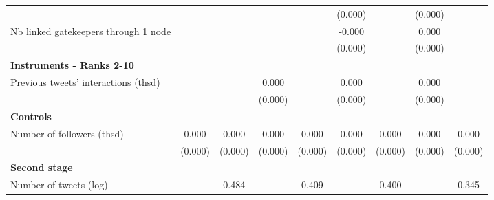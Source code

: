 {\begin{tabular}{l*{8}{c}}
                    &                     &                     &                     &                     &     (0.000)         &                     &     (0.000)         &                     \\
Nb linked gatekeepers through 1 node&                     &                     &                     &                     &      -0.000         &                     &       0.000         &                     \\
                    &                     &                     &                     &                     &     (0.000)         &                     &     (0.000)         &                     \\
\textbf{Instruments - Ranks 2-10}&                     &                     &                     &                     &                     &                     &                     &                     \\
Previous tweets' interactions (thsd)&                     &                     &       0.000\sym{***}&                     &       0.000\sym{***}&                     &       0.000\sym{***}&                     \\
                    &                     &                     &     (0.000)         &                     &     (0.000)         &                     &     (0.000)         &                     \\
\textbf{Controls}   &                     &                     &                     &                     &                     &                     &                     &                     \\
Number of followers (thsd)&       0.000         &       0.000         &       0.000         &       0.000         &       0.000         &       0.000         &       0.000         &       0.000\sym{***}\\
                    &     (0.000)         &     (0.000)         &     (0.000)         &     (0.000)         &     (0.000)         &     (0.000)         &     (0.000)         &     (0.000)         \\
\textbf{Second stage}&                     &                     &                     &                     &                     &                     &                     &                     \\
Number of tweets (log)&                     &       0.484\sym{***}&                     &       0.409\sym{***}&                     &       0.400\sym{***}&                     &       0.345\sym{***}\\

\end{tabular}}
